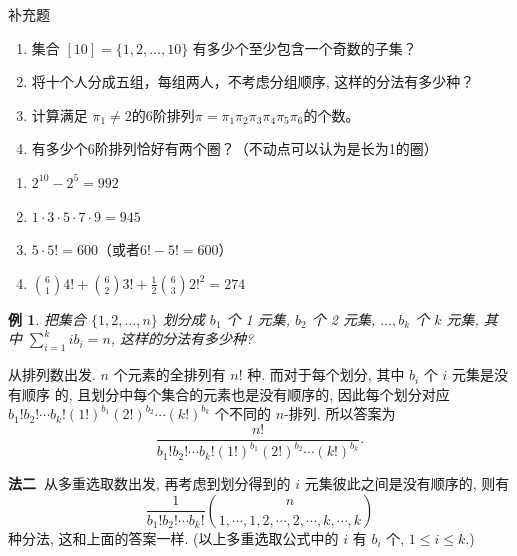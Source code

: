 \documentclass[13pt, punct]{ctexbeamer}
\def\sol{\noindent {\bf 解\ }}
\newtheorem{ex}{例}[section]
\begin{document}
\begin{frame}{补充题}



\begin{enumerate}
	\item  集合 $[10]=\{1,2,\ldots,10\}$ 有多少个至少包含一个奇数的子集？\\[8pt]

\item 将十个人分成五组，每组两人，不考虑分组顺序, 这样的分法有多少种？
	\item	计算满足 $\pi_1\neq 2$的6阶排列$\pi=\pi_1\pi_2\pi_3\pi_4\pi_5\pi_6$的个数。\\[8pt]

	\item	有多少个6阶排列恰好有两个圈？（不动点可以认为是长为1的圈）
\end{enumerate}

\pause
\begin{enumerate}
	\item $2^{10}-2^{5}=992$
	\item  $1\cdot3\cdot5\cdot7\cdot9=945$
	\item $5\cdot 5!=600$（或者$6!-5!=600$）
	\item $\displaystyle {6\choose 1}4!+{6\choose 2}3!+\frac{1}{2}{6\choose 3}2!^2=274$
\end{enumerate}
\end{frame}

\begin{frame}
	\begin{ex}
	把集合 $\{1,2, \ldots, n\}$ 划分成 $b_1$ 个 1 元集, $b_2$ 个 2 元集, $\ldots, b_k$ 个 $k$ 元集, 其 中 $\sum_{i=1}^k i b_i=n$, 这样的分法有多少种?
	\end{ex}

	\pause

    \sol 从排列数出发. $n$ 个元素的全排列有 $n!$  种. 而对于每个划分, 其中 $b_i$ 个 $i$ 元集是没有顺序 的, 且划分中每个集合的元素也是没有顺序的, 因此每个划分对应 $b_{1} ! b_{2} ! \cdots b_{k} !(1 !)^{b_1}(2 !)^{b_2} \cdots(k !)^{b_k}$ 个不同的 $n$-排列. 所以答案为
	$$
	\frac{n !}{b_{1} ! b_{2} ! \cdots b_{k} !(1 !)^{b_1}(2 !)^{b_2} \cdots(k !)^{b_k}}.
	$$


	{\bf 法二\ }从多重选取数出发, 再考虑到划分得到的 $i$ 元集彼此之间是没有顺序的, 则有
	$$
	\frac{1}{b_{1} ! b_{2} ! \cdots b_{k} !}
    \displaystyle {n \choose {1, \cdots, 1,2, \cdots, 2, \cdots, k, \cdots, k}}
%
	$$
	种分法, 这和上面的答案一样. (以上多重选取公式中的 $i$ 有 $b_i$ 个, $1 \leq i \leq k$.)
\end{frame}
\end{document}
